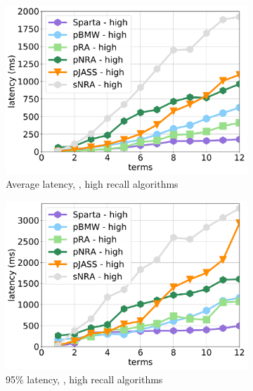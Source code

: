 {{\begin{figure}[tbh]
      \begin{subfigure}{0.325\textwidth}
         \includegraphics[width=\textwidth]{figures/latency_12threads_clueweb.pdf}
        \caption{Average latency, \cw, high recall algorithms}
        \label{fig:terms-scaling-high-avg}
      \end{subfigure}
     \hfill    
	\begin{subfigure}{0.325\textwidth}
    	\includegraphics[width=\textwidth]{figures/latency_95th_percentile_clueweb.pdf}
	\caption{95\% latency, \cw, high recall algorithms}
	\label{fig:terms-scaling-high-95}
    \end{subfigure} 
 \hfill
     \begin{subfigure}{0.325\textwidth}

\end{subfigure}
\end{figure}}}
